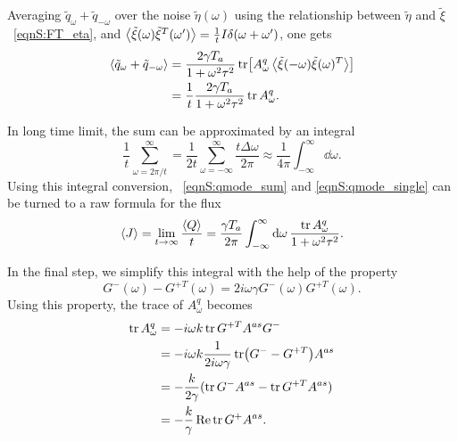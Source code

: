 \documentclass[
 amsmath,amssymb,
 aps,
 pre,
 longbibliography,
 10pt, onecolumn,
 notitlepage
]{revtex4-1}
\begin{document}
Averaging $\tilde{q}_\omega + \tilde{q}_{-\omega}$ over the noise $\tilde{\eta}(\omega)$ using the relationship between $\tilde{\eta}$ and $\tilde{\xi}$ \eqnname~\eqref{eqnS:FT_eta}, and $\expval{\tilde{\xi}(\omega) \tilde{\xi}^T(\omega')} = \frac{1}{t} I \delta(\omega + \omega')$, one gets
\begin{equation} \label{eqnS:qmode_single}
\begin{split}
\expval{\tilde{q}_\omega + \tilde{q}_{-\omega}}
&= \frac{2\gamma T_a}{1 + \omega^2 \tau^2} \tr[A_\omega^q \expval{\tilde{\xi}(-\omega)\tilde{\xi}(\omega)^T}] \\
&= \frac{1}{t} \frac{2\gamma T_a}{1 + \omega^2 \tau^2} \tr A_\omega^q .
\end{split}
\end{equation}

In long time limit, the sum can be approximated by an integral
\begin{equation}
\frac{1}{t} \sum_{\omega=2\pi/t}^{\infty} 
= \frac{1}{2t} \sum_{\omega=-\infty}^{\infty} \frac{t \Delta\omega}{2\pi} 
\approx \frac{1}{4\pi}\int_{-\infty}^{\infty} \dd{\omega} .
\end{equation}
Using this integral conversion, \eqnname~\eqref{eqnS:qmode_sum} and \eqref{eqnS:qmode_single} can be turned to a raw formula for the flux
\begin{equation} \label{eqnS:flux_integral_raw}
\expval{J} = \lim_{t\rightarrow \infty} \frac{\expval{Q}}{t}
= \frac{\gamma T_a}{2\pi} \int_{-\infty}^{\infty} \dd{\omega} \frac{\tr A_\omega^q}{1+\omega^2\tau^2} .
\end{equation}

In the final step, we simplify this integral with the help of the property \cite{Kundu2011LargeChains}
\begin{equation} \label{eqnS:response_property}
G^-(\omega) - G^{+T}(\omega) = 2i\omega\gamma G^-(\omega)G^{+T}(\omega) .
\end{equation}
Using this property, the trace of $A_\omega^q$ becomes
\begin{equation}
\begin{split}
\tr A_\omega^q &= -i\omega k \tr G^{+T} A^{as} G^- \\
&= -i\omega k \frac{1}{2i\omega \gamma} \tr (G^- - G^{+T})A^{as} \\
&= -\frac{k}{2\gamma} (\tr G^-A^{as} - \tr G^{+T}A^{as}) \\
&= -\frac{k}{\gamma} \Re\tr G^+A^{as} .
\end{split}
\end{equation}
\end{document}
